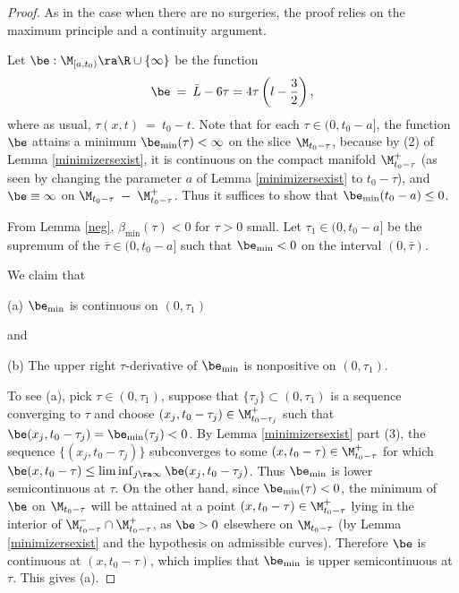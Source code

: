 \begin{proof}
As in the case when there are no surgeries,
the proof relies on the maximum principle and a continuity argument.

Let $\be:\M_{[a,t_0)}\ra \R\cup \{\infty\}$ be the function
\begin{equation}
\be \: = \: \bar L-6\tau=4\tau\left(l-\frac{3}{2}\right),
\end{equation}
where as usual, $\tau(x,t) \: = \: t_0 - t$.
Note that for each $\tau\in (0,t_0-a]$, the function
$\be$ attains a minimum $\be_{\min}(\tau)<\infty$ on the
slice $\M_{t_0 - \tau}$,  because by (2) of Lemma \ref{minimizersexist},
it is continuous on the compact manifold
$\M_{t_0 - \tau}^+$ (as seen by changing the parameter $a$ of
Lemma \ref{minimizersexist} to $t_0 - \tau$),
and $\be\equiv\infty$ on
$\M_{t_0 - \tau}\;-\;\M_{t_0 - \tau}^+$.
Thus it suffices to show that $\be_{\min}(t_0-a)\leq 0$.

From Lemma \ref{neg}, $\beta_{\min}(\tau)<0$  for $\tau>0$ small.
Let $\tau_1\in (0,t_0-a]$ be the supremum of the
$\bar \tau\in(0,t_0-a]$ such that $\be_{\min}< 0$ on the interval $(0,\bar\tau)$.

We claim that

(a) $\be_{\min}$ is continuous on $(0,\tau_1)$

and

(b) The upper right $\tau$-derivative of $\be_{\min}$ is nonpositive
on $(0,\tau_1)$.

To see (a), pick $\tau\in (0,\tau_1)$, suppose
that $\{\tau_j\}\subset (0,\tau_1)$ is a sequence
converging to $\tau$ and choose $(x_j,t_0 - \tau_j)\in \M_{t_0 - \tau_j}^+$
such that $\be(x_j,t_0 - \tau_j)=\be_{\min}(\tau_j)< 0$.
By Lemma \ref{minimizersexist}
part (3), the sequence $\{(x_j,t_0 - \tau_j)\}$ subconverges to some
$(x,t_0 - \tau)\in\M_{t_0 - \tau}^+$
for which $\be(x,t_0 - \tau)\leq \liminf_{j\ra\infty}\be(x_j,t_0 - \tau_j)$.
Thus
$\be_{\min}$ is lower semicontinuous at $\tau$.  On the other hand,
since $\be_{\min}(\tau)< 0$, the minimum of $\be$ on $\M_{t_0 - \tau}$
will be attained at a point
$(x,t_0 - \tau)\in \M_{t_0 - \tau}^+$ lying
in the interior of $\M_{t_0 - \tau}^-\cap \M_{t_0 - \tau}^+$,
as $\be>0$ elsewhere on $\M_{t_0 - \tau}$
(by Lemma \ref{minimizersexist} and the
hypothesis on admissible curves).  Therefore $\be$ is continuous at
$(x,{t_0 - \tau})$,
which implies that $\be_{\min}$ is upper semicontinuous at $\tau$.
This gives (a).


\end{proof}
